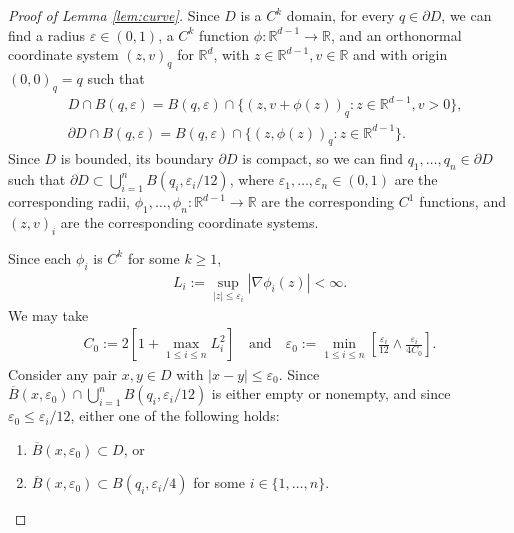 \documentclass[10pt,a4paper]{amsart}
\newcommand{\R}{\mathbb R}
\begin{document}
\begin{proof}[Proof of Lemma \ref{lem:curve}]
Since $D$ is a $C^k$ domain, for every $q \in \partial D$, we can find a radius $\varepsilon \in (0,1)$, a $C^k$ function $\phi:\R^{d-1} \to \R$, and an orthonormal coordinate system $(z,v)_q$ for $\R^d$, with $z \in \R^{d-1}, v \in \R$ and with origin $(0,0)_q=q$ such that
\begin{align*}
	&D \cap B(q,\varepsilon) = B(q,\varepsilon) \cap \{ (z,v+\phi(z))_q : z \in \R^{d-1}, v>0 \},\\
	&\partial D \cap B(q,\varepsilon) = B(q,\varepsilon) \cap \{ (z, \phi(z))_q : z \in \R^{d-1} \}.
\end{align*}
Since $D$ is bounded, its boundary $\partial D$ is compact, so we can find $q_1,\dots,q_n \in \partial D$ such that $\partial D \subset \bigcup_{i=1}^n B(q_i, \varepsilon_i/12)$, where $\varepsilon_1,\dots,\varepsilon_n \in (0,1)$ are the corresponding radii, $\phi_1,\dots, \phi_n :\R^{d-1} \to \R$ are the corresponding $C^1$ functions, and $(z,v)_i$ are the corresponding coordinate systems.

Since each $\phi_i$ is $C^k$ for some $k \ge 1$,
\begin{align}\label{curve:L}
	L_i := \sup_{|z| \le \varepsilon_i} |\nabla \phi_i(z)| < \infty.
\end{align}
We may take 
\begin{align}\label{curve:eps_0}
	C_0 := 2\left[1+\max_{1 \le i \le n}L_i^2\right]
	\quad \text{and}\quad
	\varepsilon_0 := \min_{1\le i\le n} \left[ \frac{\varepsilon_i}{12} \wedge \frac{\varepsilon_i}{4C_0} \right].
\end{align}
Consider any pair $x, y \in D$ with $|x-y| \le \varepsilon_0$.
Since $\overline{B}(x,\varepsilon_0) \cap \bigcup_{i=1}^n B(q_i, \varepsilon_i/12)$ is either empty or nonempty, and since $\varepsilon_0 \le \varepsilon_i/12$, either one of the following holds:
\begin{enumerate}
\item $\overline{B}(x, \varepsilon_0) \subset D$, or
\item $\overline{B}(x, \varepsilon_0) \subset B(q_i, \varepsilon_i/4)$ for some $i \in \{1,\dots, n\}$.
\end{enumerate}


\end{proof}
\end{document}
